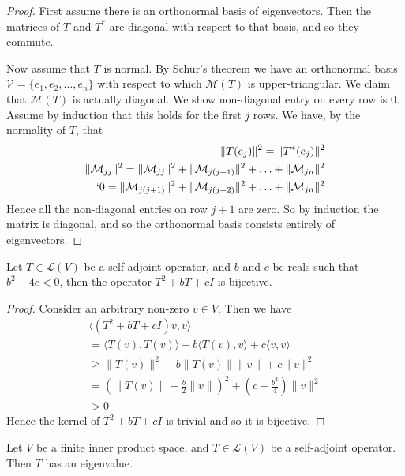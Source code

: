 \documentclass[]{article}
\begin{document}
\begin{proof}
		First assume there is an orthonormal basis of eigenvectors. Then the matrices of $T$ and $T^*$ are diagonal with respect to that basis, and so they commute.	

		Now assume that $T$ is normal. By Schur's theorem we have an orthonormal basis $\mathcal{V} = \{e_1,e_2,\ldots,e_n\}$ with respect to which $\mathcal{M}(T)$ is upper-triangular. We claim that $\mathcal{M}(T)$ is actually diagonal. We show non-diagonal entry on every row is $0$. Assume by induction that this holds for the first $j$ rows. We have, by the normality of $T$, that
		\begin{align*}
				\|T(e_j)\|^2 = \|T^*(e_j)\|^2 \\
				\|\mathcal{M}_{jj}\|^2 = \|\mathcal{M}_{jj}\|^2 + \|\mathcal{M}_{j(j+1)}\|^2 + \ldots +  \|\mathcal{M}_{jn}\|^2  \\`
				0 = \|\mathcal{M}_{j(j+1)}\|^2 + \|\mathcal{M}_{j(j+2)}\|^2 + \ldots +  \|\mathcal{M}_{jn}\|^2 
		\end{align*}
		Hence all the non-diagonal entries on row $j+1$ are zero. So by induction the matrix is diagonal, and so the orthonormal basis consists entirely of eigenvectors.
\end{proof}

\begin{thm} \label{thm:irreducible-quadratics}
		Let $T \in \mathcal{L}(V)$ be a self-adjoint operator, and $b$ and $c$ be reals such that $b^2 - 4c < 0$, then the operator $T^2 + bT + cI$ is bijective.
\end{thm}

\begin{proof}
		Consider an arbitrary non-zero $v \in V$. Then we have 
		\begin{align*}
				\langle (T^2 + bT + cI)v, v \rangle  \\
				= \langle T(v), T(v) \rangle + b\langle T(v), v \rangle + c \langle v, v \rangle \\
				\geq \|T(v)\|^2 - b \|T(v)\|\|v\| + c \|v\|^2 \\
				= (\|T(v)\| - \frac{b}{2} \|v\|)^2 + (c - \frac{b^2}{4})\|v\|^2 \\
				> 0
		\end{align*}
		Hence the kernel of  $T^2 + bT + cI$ is trivial and so it is bijective.
\end{proof}

\begin{thm}
		Let $V$ be a finite inner product space, and $T \in \mathcal{L}(V)$ be a self-adjoint operator. Then $T$ has an eigenvalue.
\end{thm}
\end{document}
